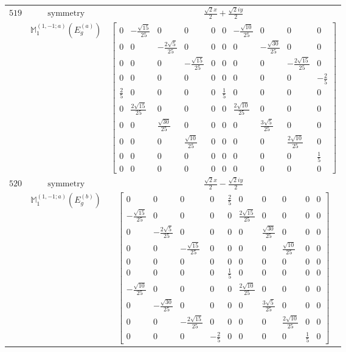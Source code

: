 \documentclass[fleqn,8pt,landscape]{jsarticle}
\begin{document}
\begin{longtable}{ccc}
$ 519 $ & $ \text{symmetry} $ & $ \frac{\sqrt{2} x}{2} + \frac{\sqrt{2} i y}{2} $ \\
$  $ & $ \mathbb{M}_{1}^{(1,-1;a)}(E_{g}^{(a)}) $ & $ \begin{bmatrix} 0 & - \frac{\sqrt{15}}{25} & 0 & 0 & 0 & 0 & - \frac{\sqrt{10}}{25} & 0 & 0 & 0 \\ 0 & 0 & - \frac{2 \sqrt{5}}{25} & 0 & 0 & 0 & 0 & - \frac{\sqrt{30}}{25} & 0 & 0 \\ 0 & 0 & 0 & - \frac{\sqrt{15}}{25} & 0 & 0 & 0 & 0 & - \frac{2 \sqrt{15}}{25} & 0 \\ 0 & 0 & 0 & 0 & 0 & 0 & 0 & 0 & 0 & - \frac{2}{5} \\ \frac{2}{5} & 0 & 0 & 0 & 0 & \frac{1}{5} & 0 & 0 & 0 & 0 \\ 0 & \frac{2 \sqrt{15}}{25} & 0 & 0 & 0 & 0 & \frac{2 \sqrt{10}}{25} & 0 & 0 & 0 \\ 0 & 0 & \frac{\sqrt{30}}{25} & 0 & 0 & 0 & 0 & \frac{3 \sqrt{5}}{25} & 0 & 0 \\ 0 & 0 & 0 & \frac{\sqrt{10}}{25} & 0 & 0 & 0 & 0 & \frac{2 \sqrt{10}}{25} & 0 \\ 0 & 0 & 0 & 0 & 0 & 0 & 0 & 0 & 0 & \frac{1}{5} \\ 0 & 0 & 0 & 0 & 0 & 0 & 0 & 0 & 0 & 0 \end{bmatrix} $ \\ \hline
$ 520 $ & $ \text{symmetry} $ & $ \frac{\sqrt{2} x}{2} - \frac{\sqrt{2} i y}{2} $ \\
$  $ & $ \mathbb{M}_{1}^{(1,-1;a)}(E_{g}^{(b)}) $ & $ \begin{bmatrix} 0 & 0 & 0 & 0 & \frac{2}{5} & 0 & 0 & 0 & 0 & 0 \\ - \frac{\sqrt{15}}{25} & 0 & 0 & 0 & 0 & \frac{2 \sqrt{15}}{25} & 0 & 0 & 0 & 0 \\ 0 & - \frac{2 \sqrt{5}}{25} & 0 & 0 & 0 & 0 & \frac{\sqrt{30}}{25} & 0 & 0 & 0 \\ 0 & 0 & - \frac{\sqrt{15}}{25} & 0 & 0 & 0 & 0 & \frac{\sqrt{10}}{25} & 0 & 0 \\ 0 & 0 & 0 & 0 & 0 & 0 & 0 & 0 & 0 & 0 \\ 0 & 0 & 0 & 0 & \frac{1}{5} & 0 & 0 & 0 & 0 & 0 \\ - \frac{\sqrt{10}}{25} & 0 & 0 & 0 & 0 & \frac{2 \sqrt{10}}{25} & 0 & 0 & 0 & 0 \\ 0 & - \frac{\sqrt{30}}{25} & 0 & 0 & 0 & 0 & \frac{3 \sqrt{5}}{25} & 0 & 0 & 0 \\ 0 & 0 & - \frac{2 \sqrt{15}}{25} & 0 & 0 & 0 & 0 & \frac{2 \sqrt{10}}{25} & 0 & 0 \\ 0 & 0 & 0 & - \frac{2}{5} & 0 & 0 & 0 & 0 & \frac{1}{5} & 0 \end{bmatrix} $ \\ \hline

\end{longtable}
\end{document}

